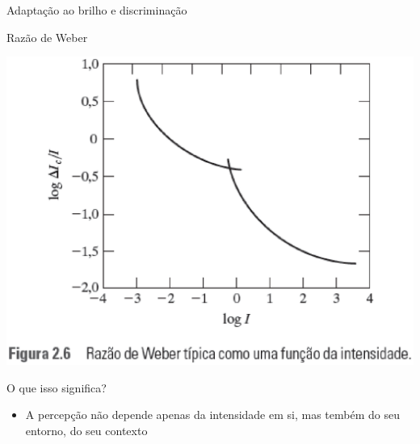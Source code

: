       \begin{slide}[toc=]{Adaptação ao brilho e discriminação}
         \begin{itemize}
            {\item Razão de Weber
            \begin{center}
               \includegraphics[width=1\textwidth]{figs/rweber_gw.eps}
            \end{center}}
            \item O que isso significa?\pause
            \begin{itemize}
               \item A percepção não depende apenas da intensidade em si, mas tembém do seu 
               entorno, do seu contexto
            \end{itemize}
         \end{itemize}
      \end{slide}

